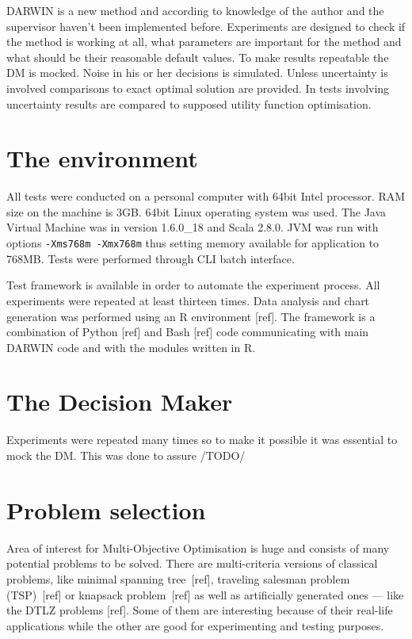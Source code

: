 DARWIN is a new method and according to knowledge of the author and the
supervisor haven't been implemented before. Experiments are
designed to check if the method is working at all, what parameters are important
for the method and what should be their reasonable default values. To make
results repeatable the DM is mocked. Noise in his or her decisions is
simulated. Unless uncertainty is involved comparisons to exact optimal
solution are provided. In tests involving uncertainty results are compared to
supposed utility function optimisation. 

\section{The environment}

All tests were conducted on a personal computer with 64bit Intel
processor. RAM size on the machine is 3GB. 64bit Linux operating system was
used. The Java Virtual Machine was in version 1.6.0\_18 and Scala 2.8.0. JVM
was run with options \texttt{-Xms768m -Xmx768m} thus setting memory available
for application to 768MB. Tests were performed through CLI batch interface.

Test framework is available in order to automate the experiment process. All
experiments were repeated at least thirteen times. Data analysis and chart
generation was performed using an R environment [ref]. The framework is a
combination of Python [ref] and Bash [ref] code communicating with main DARWIN
code and with the modules written in R.

\section{The Decision Maker}

Experiments were repeated many times so to make it possible it was essential
to mock the DM. This was done to assure /TODO/


\section{Problem selection}

Area of interest for Multi-Objective Optimisation is huge and consists of many
potential problems to be solved. There are multi-criteria versions of
classical problems, like minimal spanning tree~[ref], traveling salesman
problem (TSP)~[ref] or knapsack problem~[ref] as well as artificially
generated ones --- like the DTLZ problems [ref]. Some of them are interesting
because of their real-life applications while the other are good for
experimenting and testing purposes.

